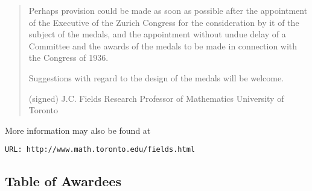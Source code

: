 \begin{quote}
  Perhaps provision could be made as soon as possible after the appointment
of the Executive of the Zurich Congress for the consideration by it of the
subject of the medals, and the appointment without undue delay of a
Committee and the awards of the medals to be made in connection with the
Congress of 1936.

  Suggestions with regard to the design of the medals will be welcome.


                                 (signed)   J.C. Fields
                                            Research Professor of Mathematics
                                            University of Toronto
\end{quote}


More information may also be found at
%
%
\begin{verbatim}
URL: http://www.math.toronto.edu/fields.html
\end{verbatim}

\vfill\pagebreak

\subsection{Table of Awardees}




